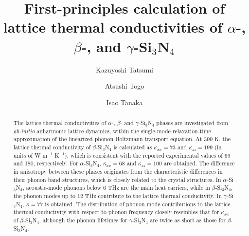 \documentclass[twocolumn,amsmath,amssymb,a4paper,prb,superscriptaddress,floatfix]{revtex4-1}
\begin{document}
\title{First-principles calculation of lattice thermal
conductivities of $\alpha$-, $\beta$-, and $\gamma$-Si$_3$N$_4$}

\author{Kazuyoshi Tatsumi} 

\author{Atsushi Togo}

\author{Isao Tanaka}

\begin{abstract}
The lattice thermal conductivities of $\alpha$-, $\beta$- and $\gamma$-Si$_3$N$_4$
phases are investigated from {\it ab-initio} anharmonic lattice dynamics, within
the single-mode relaxation-time approximation of the linearized phonon Boltzmann
transport equation. At 300 K, the lattice thermal conductivity of
$\beta$-Si$_3$N$_4$ is calculated as $\kappa_{xx}=73$ and $\kappa_{zz}=199$ (in
units of W m$^{-1}$ K$^{-1}$), which is consistent with the reported experimental
values of 69 and 180, respectively. For $\alpha$-Si$_3$N$_4$, $\kappa_{xx}=68$
and $\kappa_{zz}=100$ are obtained.  The difference in anisotropy between these
phases originates from the characteristic differences in their phonon band
structures, which is closely related to the crystal structures.  In $\alpha$-Si$_3$N$_4$,
acoustic-mode phonons below 6 THz are the main heat carriers, while in
$\beta$-Si$_3$N$_4$, the phonon modes up to 12 THz contribute to the lattice
thermal conductivity. In $\gamma$-Si$_3$N$_4$, $\kappa=77$ is obtained. The
distribution of phonon mode contributions to the lattice thermal conductivity with
respect to phonon frequency closely resembles that for $\kappa_{xx}$
of $\beta$-Si$_3$N$_4$, although the phonon lifetimes for $\gamma$-Si$_3$N$_4$ are
twice as short as those for $\beta$-Si$_3$N$_4$.
\end{abstract}

\maketitle
\end{document}
